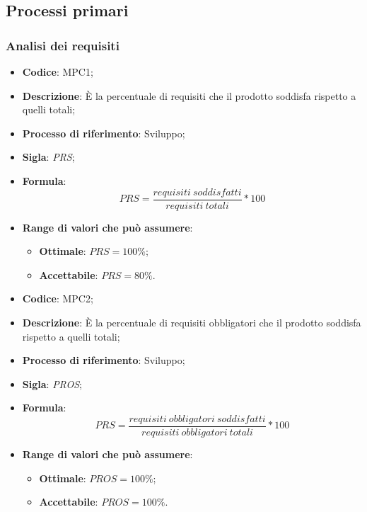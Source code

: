 \subsection{Processi primari}
\subsubsection{Analisi dei requisiti}
\vspace{-1cm}
\begin{itemize}
	\item \textbf{Codice}: MPC1;
	\item \textbf{Descrizione}: È la percentuale di requisiti che il prodotto soddisfa rispetto a quelli totali;
	\item \textbf{Processo di riferimento}: Sviluppo;
	\item \textbf{Sigla}: \textit{PRS};
	\item \textbf{Formula}: \[ PRS = \frac{requisiti \ soddisfatti}{requisiti \ totali} \ast 100 \]
	\item \textbf{Range di valori che può assumere}:
		\begin{itemize}
			\item \textbf{Ottimale}: $PRS = 100 \%$;
			\item \textbf{Accettabile}: $PRS = 80 \%$.
		\end{itemize}
\end{itemize}
\vspace{-1cm}
\begin{itemize}
	\item \textbf{Codice}: MPC2;
	\item \textbf{Descrizione}: È la percentuale di requisiti obbligatori che il prodotto soddisfa rispetto a quelli totali;
	\item \textbf{Processo di riferimento}: Sviluppo;
	\item \textbf{Sigla}: \textit{PROS};
	\item \textbf{Formula}: \[ PRS = \frac{requisiti \ obbligatori \ soddisfatti}{requisiti \ obbligatori \ totali} \ast 100 \]
	\item \textbf{Range di valori che può assumere}:
		\begin{itemize}
			\item \textbf{Ottimale}: $PROS = 100 \%$;
			\item \textbf{Accettabile}: $PROS = 100 \%$.
		\end{itemize}
\end{itemize}
